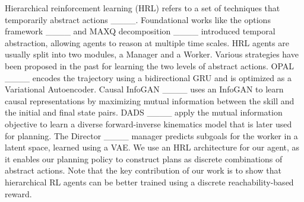 Hierarchical reinforcement learning (HRL) refers to a set of techniques that temporarily abstract actions ____.
Foundational works like the options framework ____ and MAXQ decomposition ____ introduced temporal abstraction, allowing agents to reason at multiple time scales.
HRL agents are usually split into two modules, a Manager and a Worker.
Various strategies have been proposed in the past for learning the two levels of abstract actions.
OPAL ____ encodes the trajectory using a bidirectional GRU and is optimized as a Variational Autoencoder.
Causal InfoGAN ____ uses an InfoGAN to learn causal representations by maximizing mutual information between the skill and the initial and final state pairs.
DADS ____ apply the mutual information objective to learn a diverse forward-inverse kinematics model that is later used for planning.
The Director ____ manager predicts subgoals for the worker in a latent space, learned using a VAE.
We use an HRL architecture for our agent, as it enables our planning policy to construct plans as discrete combinations of abstract actions.
Note that the key contribution of our work is to show that hierarchical RL agents can be better trained using a discrete reachability-based reward.
